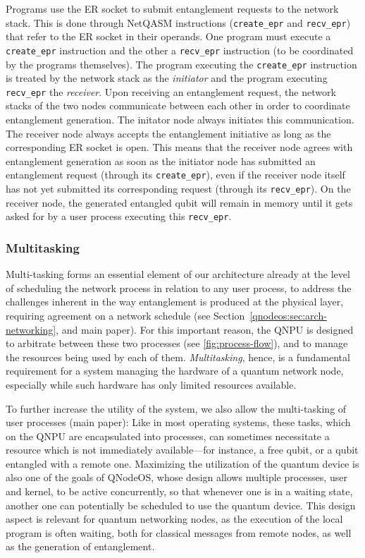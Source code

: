 Programs use the \ac{ER} socket to submit entanglement requests to the network stack. This is done through NetQASM instructions (\texttt{create\_epr} and \texttt{recv\_epr}) that refer to the \ac{ER} socket in their operands. One program must execute a \texttt{create\_epr} instruction and the other a \texttt{recv\_epr} instruction (to be coordinated by the programs themselves). The program executing the \texttt{create\_epr} instruction is treated by the network stack as the \emph{initiator} and the program executing \texttt{recv\_epr} the \emph{receiver}. 
Upon receiving an entanglement request, the network stacks of the two nodes communicate between each other in order to coordinate entanglement generation. The initator node always initiates this communication. The receiver node always accepts the entanglement initiative as long as the corresponding \ac{ER} socket is open. This means that the receiver node agrees with entanglement generation as soon as the initiator node has submitted an entanglement request (through its \texttt{create\_epr}), even if the receiver node itself has not yet submitted its corresponding request (through its \texttt{recv\_epr}). On the receiver node, the generated entangled qubit will remain in memory until it gets asked for by a user process executing this \texttt{recv\_epr}.

\subsubsection{Multitasking}

Multi-tasking forms an essential element of our architecture already at the level of scheduling the network process in relation to any user process, to address the challenges inherent in the way entanglement is produced at the physical layer, requiring agreement on a network schedule (see Section~\ref{qnodeos:sec:arch-networking}, and main paper). For this important reason, the \ac{QNPU} is designed to arbitrate between these two processes (see \cref{fig:process-flow}), and to manage the resources being used by each of them. \emph{Multitasking}, hence, is a fundamental requirement for a system managing the hardware of a quantum network node, especially while such hardware has only limited resources available. 

To further increase the utility of the system, we also allow the multi-tasking of user processes (main paper):
Like in most operating systems, these tasks, which on the \ac{QNPU} are encapsulated into processes, can sometimes necessitate a resource which is not immediately available---for instance, a free qubit, or a qubit entangled with a remote one. Maximizing the utilization of the quantum device is also one of the goals of \ac{QNodeOS}, whose design allows multiple processes, user and kernel, to be active concurrently, so that whenever one is in a waiting state, another one can potentially be scheduled to use the quantum device.  This design aspect is relevant for quantum networking nodes, as the execution of the local program is often waiting, both for classical messages from remote nodes, as well as the generation of entanglement. 

